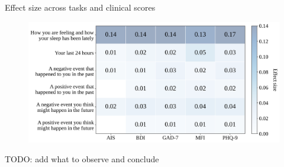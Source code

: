 \documentclass[handout,10pt]{beamer}
\begin{document}
\begin{frame}{Effect size across tasks and clinical scores}

\begin{figure}
    \centering
    \includegraphics[scale=0.35]{img/topic_modeling/heatmap_effect_sizes/V5_V6_V7_V8_V9_V10_phq9_gad7_bdi_ais_mfi_global_heatmap.png}
    \label{fig:popgen_clinical_heatmap}
\end{figure}

TODO: add what to observe and conclude

\end{frame}
\end{document}
